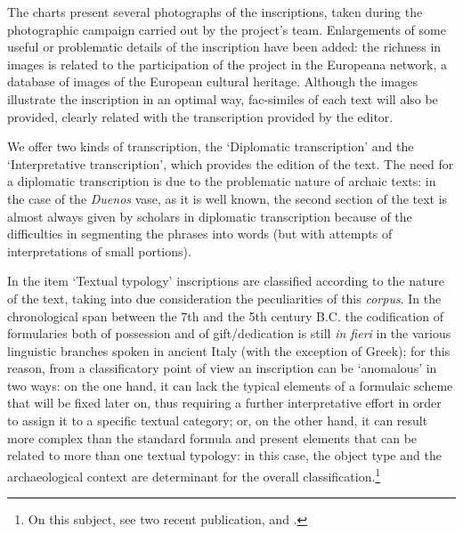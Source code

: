 \documentclass[amsthm,ebook]{saparticle}
\begin{document}
The charts present several photographs of the inscriptions, taken during the photographic campaign carried out by the
project's team. Enlargements of some useful or problematic details of the inscription have been added: the richness in
images is related to the participation of the project in the Europeana network, a database of images of the European
cultural heritage. Although the images illustrate the inscription in an optimal way, fac-similes of each text will also
be provided, clearly related with the transcription provided by the editor. 

We offer two kinds of transcription, the ‘Diplomatic transcription' and the ‘Interpretative transcription', which
provides the edition of the text. The need for a diplomatic transcription is due to the problematic nature of archaic
texts: in the case of the \emph{Duenos} vase, as it is well known, the second section of the text is almost always given by
scholars in diplomatic transcription because of the difficulties in segmenting the phrases into words (but with
attempts of interpretations of small portions). 

In the item `Textual typology' inscriptions are classified according to the nature of the text, taking into due
consideration the peculiarities of this \emph{corpus}. In the chronological span between the 7th and the 5th century B.C. the
codification of formularies both of possession and of gift/dedication is still \emph{in fieri} in the various linguistic
branches spoken in ancient Italy (with the exception of Greek); for this reason, from a classificatory point of view an
inscription can be ‘anomalous' in two ways: on the one hand, it can lack the typical elements of a formulaic scheme
that will be fixed later on, thus requiring a further interpretative effort in order to assign it to a specific textual
category; or, on the other hand, it can result more complex than the standard formula and present elements that can be
related to more than one textual typology: in this case, the object type and the archaeological context are determinant
for the overall classification.\footnote{On this subject, see two recent publication, \citet{poccetti_paradigmi_2009} and \citet{maras_storie_2015}.} 
\end{document}
